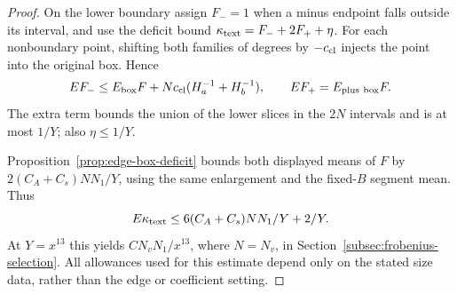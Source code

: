 \begin{proof}
On the lower boundary assign \(F_-=1\) when a minus endpoint
falls outside its interval, and use the deficit bound
\(\kappa_{\rm text}=F_-+2F_++\eta\). For each nonboundary
point, shifting both families of degrees by \(-c_{\rm cl}\)
injects the point into the original box. Hence
\[
 \mathbb E F_-\le\mathbb E_{\rm box}F+
                     Nc_{\rm cl}(H_a^{-1}+H_b^{-1}),
 \qquad \mathbb E F_+=\mathbb E_{\rm plus\ box}F .
\]
The extra term bounds the union of the lower slices in the
\(2N\) intervals and is at most \(1/Y\); also \(\eta\le1/Y\).

Proposition~\ref{prop:edge-box-deficit} bounds both displayed
means of \(F\) by \(2(C_A+C_s)NN_1/Y\), using the same
enlargement and the fixed-\(B\) segment mean. Thus
\[
 \mathbb E\kappa_{\rm text}
 \le 6(C_A+C_s)NN_1/Y+2/Y .
\]
At \(Y=x^{13}\) this yields \(C N_vN_1/x^{13}\), where
\(N=N_v\), in Section~\ref{subsec:frobenius-selection}.
All allowances used for this estimate depend only on the
stated size data, rather than the edge or coefficient setting.

\end{proof}
